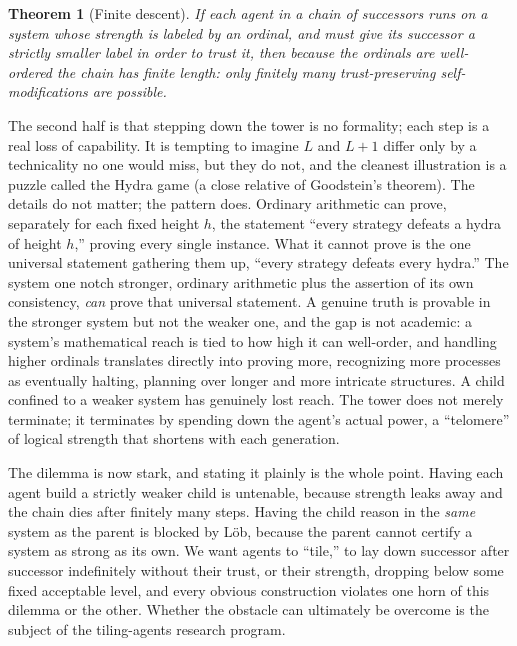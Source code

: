 \documentclass[10pt]{article}
\newtheorem{theorem}{Theorem}[section]
\theoremstyle{definition}
\theoremstyle{remark}
\begin{document}
\begin{theorem}[Finite descent]
\label{thm:descent}
If each agent in a chain of successors runs on a system whose strength is labeled by an ordinal, and must give its successor a strictly smaller label in order to trust it, then because the ordinals are well-ordered the chain has finite length: only finitely many trust-preserving self-modifications are possible.
\end{theorem}

The second half is that stepping down the tower is no formality; each step is a real loss of capability. It is tempting to imagine $L$ and $L{+}1$ differ only by a technicality no one would miss, but they do not, and the cleanest illustration is a puzzle called the Hydra game (a close relative of Goodstein's theorem). The details do not matter; the pattern does. Ordinary arithmetic can prove, separately for each fixed height $h$, the statement ``every strategy defeats a hydra of height $h$,'' proving every single instance. What it cannot prove is the one universal statement gathering them up, ``every strategy defeats every hydra.'' The system one notch stronger, ordinary arithmetic plus the assertion of its own consistency, \emph{can} prove that universal statement. A genuine truth is provable in the stronger system but not the weaker one, and the gap is not academic: a system's mathematical reach is tied to how high it can well-order, and handling higher ordinals translates directly into proving more, recognizing more processes as eventually halting, planning over longer and more intricate structures. A child confined to a weaker system has genuinely lost reach. The tower does not merely terminate; it terminates by spending down the agent's actual power, a ``telomere'' of logical strength that shortens with each generation.

The dilemma is now stark, and stating it plainly is the whole point. Having each agent build a strictly weaker child is untenable, because strength leaks away and the chain dies after finitely many steps. Having the child reason in the \emph{same} system as the parent is blocked by L\"ob, because the parent cannot certify a system as strong as its own. We want agents to ``tile,'' to lay down successor after successor indefinitely without their trust, or their strength, dropping below some fixed acceptable level, and every obvious construction violates one horn of this dilemma or the other. Whether the obstacle can ultimately be overcome is the subject of the tiling-agents research program.
\end{document}
